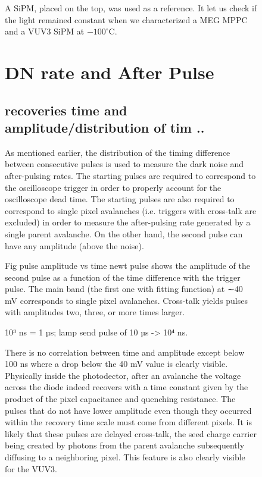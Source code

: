 \begin{figure}[!hbtp]
  
  
  A SiPM, placed on the top, was used as a reference. It let us check if the light remained constant when we characterized a MEG MPPC and a VUV3 SiPM at 
  $-100^\circ$C.
  
  
  \section{DN rate and After Pulse}\label{DN}
  
  \subsection{recoveries time and amplitude/distribution of tim ..}
  
  As mentioned earlier, the distribution of the timing difference between consecutive pulses is used to measure the dark noise and 
  after-pulsing rates. The starting pulses are required to correspond to the oscilloscope trigger in order to properly
  account for the oscilloscope dead time. The starting pulses are also required to correspond to single pixel avalanches
  (i.e. triggers with cross-talk are excluded) in order to measure the after-pulsing rate generated by a single parent avalanche.
  On the other hand, the second pulse can have any amplitude (above the noise). 
  
  Fig pulse amplitude vs time newt pulse shows the amplitude of the second pulse as a function of the time difference with the trigger
  pulse. 
  The main band (the first one with fitting function) at ∼40 mV corresponds to single pixel avalanches. 
  Cross-talk yields pulses with amplitudes two, three, or more times larger. 
  
  10³ ns = 1 µs; lamp send pulse of 10 µs -> 10⁴ ns.
  
  There is no correlation between time and amplitude except below 100 ns where a drop below the 40 mV value is clearly visible. 
  Physically inside the  photodector, after an avalanche the voltage across the diode indeed recovers with a time constant 
  given by the product of the pixel capacitance and quenching resistance. The pulses that do not have lower amplitude even
  though they occurred within the recovery time scale must
  come from different pixels. It is likely that these pulses are
  delayed cross-talk, the seed charge carrier being created by
  photons from the parent avalanche subsequently diffusing to
  a neighboring pixel. This feature is also clearly visible for the VUV3. 
  

\end{figure}
